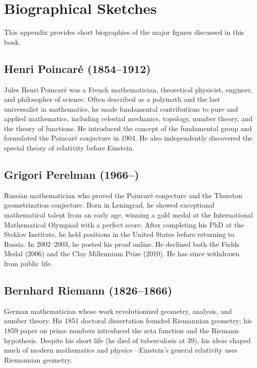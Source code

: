 \chapter{Biographical Sketches}
\label{app:biographies}

This appendix provides short biographies of the major figures discussed in this book.

\section*{Henri Poincar\'{e} (1854--1912)}

Jules Henri Poincar\'{e} was a French mathematician, theoretical physicist, engineer, and philosopher of science. Often described as a polymath and the last universalist in mathematics, he made fundamental contributions to pure and applied mathematics, including celestial mechanics, topology, number theory, and the theory of functions. He introduced the concept of the fundamental group and formulated the Poincar\'{e} conjecture in 1904. He also independently discovered the special theory of relativity before Einstein.

\section*{Grigori Perelman (1966--)}

Russian mathematician who proved the Poincar\'{e} conjecture and the Thurston geometrization conjecture. Born in Leningrad, he showed exceptional mathematical talent from an early age, winning a gold medal at the International Mathematical Olympiad with a perfect score. After completing his PhD at the Steklov Institute, he held positions in the United States before returning to Russia. In 2002--2003, he posted his proof online. He declined both the Fields Medal (2006) and the Clay Millennium Prize (2010). He has since withdrawn from public life.

\section*{Bernhard Riemann (1826--1866)}

German mathematician whose work revolutionized geometry, analysis, and number theory. His 1851 doctoral dissertation founded Riemannian geometry; his 1859 paper on prime numbers introduced the zeta function and the Riemann hypothesis. Despite his short life (he died of tuberculosis at 39), his ideas shaped much of modern mathematics and physics---Einstein's general relativity uses Riemannian geometry.

